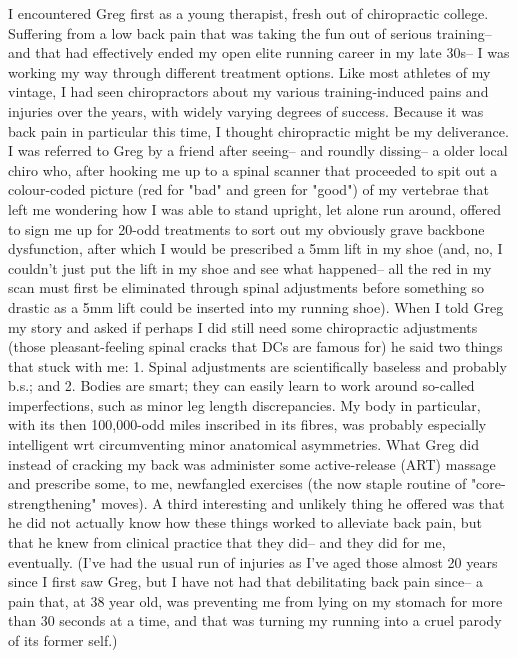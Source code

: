 I encountered Greg first as a young therapist, fresh out of chiropractic college. Suffering from a low back pain that was taking the fun out of serious training-- and that had effectively ended my open elite running career in my late 30s-- I was working my way through different treatment options. Like most athletes of my vintage, I had seen chiropractors about my various training-induced pains and injuries over the years, with widely varying degrees of success. Because it was back pain in particular this time, I thought chiropractic might be my deliverance. I was referred to Greg by a friend after seeing-- and roundly dissing-- a older local chiro who, after hooking me up to a spinal scanner that proceeded to spit out a colour-coded picture (red for "bad" and green for "good") of my vertebrae that left me wondering how I was able to stand upright, let alone run around, offered to sign me up for 20-odd treatments to sort out my obviously grave backbone dysfunction, after which I would be prescribed a 5mm lift in my shoe (and, no, I couldn't just put the lift in my shoe and see what happened-- all the red in my scan must first be eliminated through spinal adjustments before something so drastic as a 5mm lift could be inserted into my running shoe). When I told Greg my story and asked if perhaps I did still need some chiropractic adjustments (those pleasant-feeling spinal cracks that DCs are famous for) he said two things that stuck with me: 1. Spinal adjustments are scientifically baseless and probably b.s.; and 2. Bodies are smart; they can easily learn to work around so-called imperfections, such as minor leg length discrepancies. My body in particular, with its then 100,000-odd miles inscribed in its fibres, was probably especially intelligent wrt circumventing minor anatomical asymmetries. What Greg did instead of cracking my back was administer some active-release (ART) massage and prescribe some, to me, newfangled exercises (the now staple routine of "core-strengthening" moves). A third interesting and unlikely thing he offered was that he did not actually know how these things worked to alleviate back pain, but that he knew from clinical practice that they did-- and they did for me, eventually. (I've had the usual run of injuries as I've aged those almost 20 years since I first saw Greg, but I have not had that debilitating back pain since-- a pain that, at 38 year old, was preventing me from lying on my stomach for more than 30 seconds at a time, and that was turning my running into a cruel parody of its former self.)


